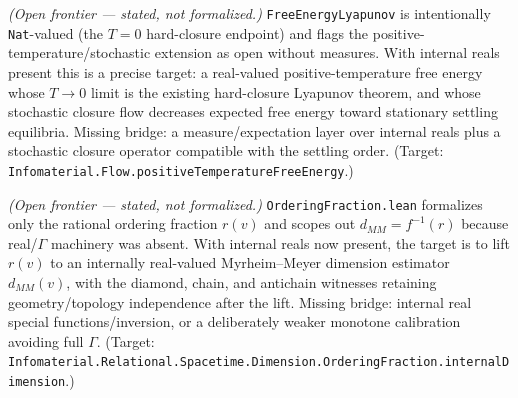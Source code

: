 \begin{theorem}\label{thm:positive-temperature-free-energy-flow}\notready{}
\emph{(Open frontier --- stated, not formalized.)} \texttt{FreeEnergyLyapunov} is intentionally
\texttt{Nat}-valued (the $T=0$ hard-closure endpoint) and flags the positive-temperature/stochastic
extension as open without measures. With internal reals present this is a precise target: a
real-valued positive-temperature free energy whose $T\to 0$ limit is the existing hard-closure
Lyapunov theorem, and whose stochastic closure flow decreases expected free energy toward
stationary settling equilibria. Missing bridge: a measure/expectation layer over internal reals
plus a stochastic closure operator compatible with the settling order. (Target:
\texttt{Infomaterial.Flow.positiveTemperatureFreeEnergy}.)
\end{theorem}

\begin{theorem}\label{thm:myrheim-meyer-dimension-internal-reals}\notready{}
\emph{(Open frontier --- stated, not formalized.)} \texttt{OrderingFraction.lean} formalizes only the
rational ordering fraction $r(v)$ and scopes out $d_{MM}=f^{-1}(r)$ because real/$\Gamma$ machinery
was absent. With internal
reals now present, the target is to lift $r(v)$ to an internally real-valued Myrheim--Meyer
dimension estimator $d_{MM}(v)$, with the diamond, chain, and antichain witnesses retaining
geometry/topology independence after the lift. Missing bridge: internal real special
functions/inversion, or a deliberately weaker monotone calibration avoiding full $\Gamma$.
(Target: \texttt{Infomaterial.Relational.Spacetime.Dimension.OrderingFraction.internalDimension}.)
\end{theorem}
